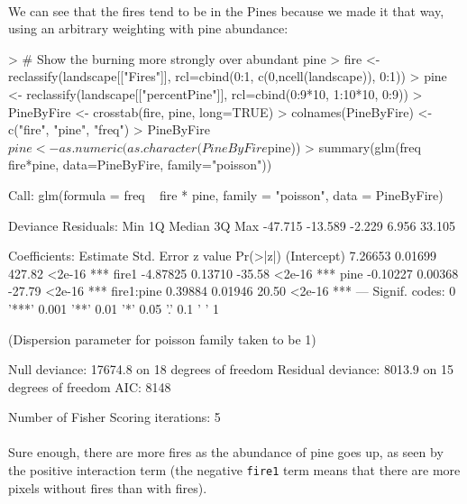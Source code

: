 \documentclass{article}
\begin{document}
\paragraph{}
We can see that the fires tend to be in the Pines because we made it that way, using an arbitrary weighting with pine abundance:

\begin{Schunk}
\begin{Sinput}
> # Show the burning more strongly over abundant pine
> fire <- reclassify(landscape[["Fires"]], rcl=cbind(0:1, c(0,ncell(landscape)), 0:1))
> pine <- reclassify(landscape[["percentPine"]], rcl=cbind(0:9*10, 1:10*10, 0:9))
> PineByFire <- crosstab(fire, pine, long=TRUE)
> colnames(PineByFire) <- c("fire", "pine", "freq")
> PineByFire$pine <- as.numeric(as.character(PineByFire$pine))
> summary(glm(freq ~ fire*pine, data=PineByFire, family="poisson"))
\end{Sinput}
\begin{Soutput}
Call:
glm(formula = freq ~ fire * pine, family = "poisson", data = PineByFire)

Deviance Residuals: 
    Min       1Q   Median       3Q      Max  
-47.715  -13.589   -2.229    6.956   33.105  

Coefficients:
            Estimate Std. Error z value Pr(>|z|)    
(Intercept)  7.26653    0.01699  427.82   <2e-16 ***
fire1       -4.87825    0.13710  -35.58   <2e-16 ***
pine        -0.10227    0.00368  -27.79   <2e-16 ***
fire1:pine   0.39884    0.01946   20.50   <2e-16 ***
---
Signif. codes:  0 '***' 0.001 '**' 0.01 '*' 0.05 '.' 0.1 ' ' 1

(Dispersion parameter for poisson family taken to be 1)

    Null deviance: 17674.8  on 18  degrees of freedom
Residual deviance:  8013.9  on 15  degrees of freedom
AIC: 8148

Number of Fisher Scoring iterations: 5
\end{Soutput}
\end{Schunk}

\paragraph{}
Sure enough, there are more fires as the abundance of pine goes up, as seen by the positive interaction term (the negative \texttt{fire1} term means that there are more pixels without fires than with fires).
\end{document}
